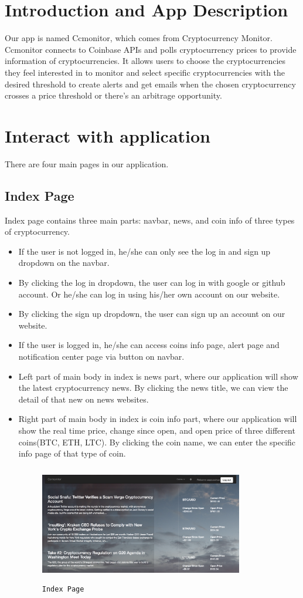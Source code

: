 \section{Introduction and App Description}
Our app is named Ccmonitor, which comes from Cryptocurrency Monitor. 
Ccmonitor connects to Coinbase APIs and polls cryptocurrency prices
to provide information of cryptocurrencies. It allows users to choose 
the cryptocurrencies they feel interested in to monitor and select 
specific cryptocurrencies with the desired threshold to create alerts 
and get emails when the chosen cryptocurrency crosses a price 
threshold or there’s an arbitrage opportunity. 




\section{Interact with application}
There are four main pages in our application.
\subsection{Index Page}
Index page contains three main parts: navbar, news, and coin info of three types 
of cryptocurrency.
\begin{itemize}
\item If the user is not logged in, he/she can only see the log in and sign up
dropdown on the navbar. 
\item By clicking the log in dropdown, the user can log in with google or github
account. Or he/she can log in using his/her own account on our website.
\item By clicking the sign up dropdown, the user can sign up an account on our 
website.
\item If the user is logged in, he/she can access coins info page, alert page
and notification center page via button on navbar.
\item Left part of main body in index is news part, where our application will
show the latest cryptocurrency news. By clicking the news title, we can view the
detail of that new on news websites.
\item Right part of main body in index is coin info part, where our application 
will show the real time price, change since open, and open price of three different 
coins(BTC, ETH, LTC). By clicking the coin name, we can enter the specific info 
page of that type of coin.
\begin{figure}[!htb]
\includegraphics[height=2.0in, width=3.5in]{index.png}
\caption{\texttt{Index Page}}
\end{figure}
\end{itemize}


